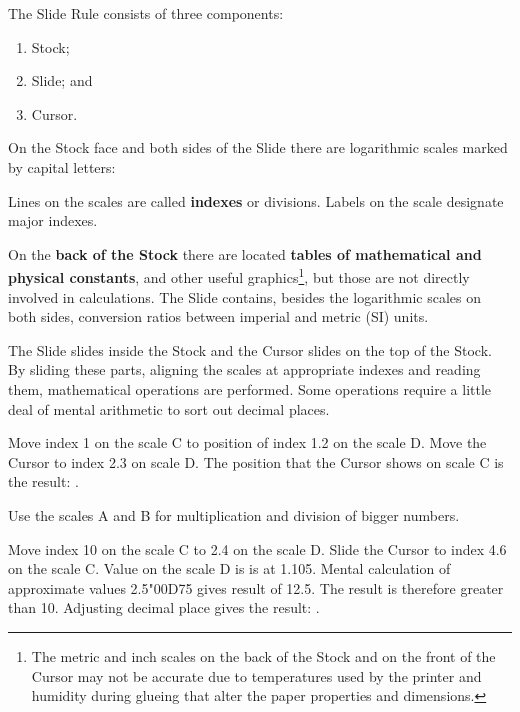   \begin{multicols*}{3}
  \normalsize{
  The Slide Rule consists of three components:
    \begin{enumerate}
      \setlength{\parskip}{0pt}
      \setlength{\parsep}{0pt}
      \item Stock;
      \item Slide; and
      \item Cursor.
    \end{enumerate}

  On the Stock face and both sides of the Slide there are logarithmic scales marked by capital letters:

  
  Lines on the scales are called \textbf{indexes} or divisions. Labels on the scale designate major indexes.

  On the \textbf{back of the Stock} there are located \textbf{tables of mathematical and physical constants}, and other useful graphics\footnote{The metric and inch scales on the back of the Stock and on the front of the Cursor may not be accurate due to temperatures used by the printer and humidity during glueing that alter the paper properties and dimensions.}, but those are not directly involved in calculations. The Slide contains, besides the logarithmic scales on both sides, conversion ratios between imperial and metric (SI) units.

  The Slide slides inside the Stock and the Cursor slides on the top of the Stock. By sliding these parts, aligning the scales at appropriate indexes and reading them, mathematical operations are performed. Some operations require a little deal of mental arithmetic to sort out decimal places.

  

Move index 1 on the scale C to position of index 1.2 on the scale D.
Move the Cursor to index 2.3 on scale D.
The position that the Cursor shows on scale C is the result: .

\footnotesize Use the scales A and B for multiplication and division of bigger numbers.
\normalsize


Move index 10 on the scale C to 2.4 on the scale D.
Slide the Cursor to index 4.6 on the scale C.
Value on the scale D is is at 1.105.
Mental calculation of approximate values 2.5{\char"00D7}5 gives result of 12.5.
The result is therefore greater than 10.
Adjusting decimal place gives the result: . 

}
\end{multicols*}
